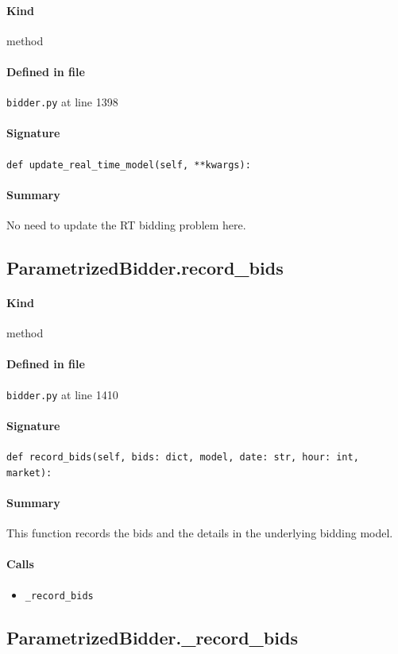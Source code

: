 \documentclass[11pt]{report}
\begin{document}
\paragraph{Kind} method
\paragraph{Defined in file} \texttt{bidder.py} at line 1398
\paragraph{Signature} \texttt{def update\_real\_time\_model(self, **kwargs):}
\paragraph{Summary} No need to update the RT bidding problem here.
\subsection{ParametrizedBidder.record\_bids}
\label{def:bidder.py:ParametrizedBidder.record_bids:L1410}
\paragraph{Kind} method
\paragraph{Defined in file} \texttt{bidder.py} at line 1410
\paragraph{Signature} \texttt{def record\_bids(self, bids: dict, model, date: str, hour: int, market):}
\paragraph{Summary} This function records the bids and the details in the underlying bidding model.
\paragraph{Calls}
\begin{itemize}[leftmargin=*]
  \item \texttt{\_record\_bids}
\end{itemize}
\subsection{ParametrizedBidder.\_record\_bids}
\label{def:bidder.py:ParametrizedBidder._record_bids:L1439}
\end{document}
